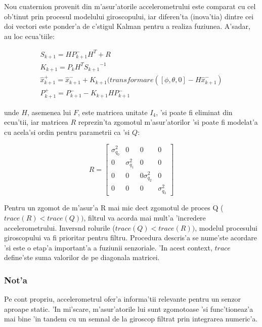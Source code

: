 \documentclass[12pt,a4paper,twoside]{report}
\begin{document}
\vspace{5px}

Nou cuaternion provenit din m'asur'atorile accelerometrului este comparat cu cel ob'tinut prin procesul modelului giroscopului, iar diferen'ta (inova'tia) dintre cei doi vectori este ponder'a de c\ia 'stigul Kalman pentru a realiza fuziunea. A'sadar, au loc ecua'tiile:

\begin{gather}
    S_{k+1} = H P^-_{k+1}H ^T + R \\
    K_{k+1} = P_k H^T {S_{k+1}}^{-1} \\
    \hat x^+_{k+1} = \hat x^-_{k+1} + K_{k+1} ( transformare([\phi, \theta, 0] - H  \hat x^-_{k+1}) \\
    P^+_{k+1} = P^-_{k+1} - K_{k+1} H P^-_{k+1}
\end{gather}

unde $H$, asemenea lui $F$, este matricea unitate $I_4$, 'si poate fi eliminat din ecua'tii, iar matricea $R$ reprezin'ta zgomotul m'asur'atorilor 'si poate fi modelat'a cu acela'si ordin pentru parametrii ca 'si $Q$: 

\begin{equation}
    R = \begin{bmatrix}
     \sigma_{q_0}^2 & 0 & 0 & 0 \\
    0 & \sigma_{q_1}^2 & 0 & 0  \\
    0 & 0 & 0  \sigma_{q_2}^2 & 0 \\
    0 & 0 & 0 &  \sigma_{q_3}^2
    \end{bmatrix}
\end{equation}

Pentru un zgomot de m'asur'a R mai mic dec\ia t zgomotul de proces Q ($trace(R)<trace(Q))$, filtrul va acorda mai mult'a 'incredere accelerometrului. Invers\ia nd rolurile ($trace(Q)<trace(R))$, modelul procesului giroscopului va fi prioritar pentru filtru. Procedura descris'a se nume'ste acordare 'si este o etap'a important'a a fuziunii senzoriale. 'In acest context, $trace$ define'ste suma valorilor de pe diagonala matricei.

\subsubsection{Not'a}

Pe cont propriu, accelerometrul ofer'a informa'tii relevante pentru un senzor aproape static. 'In mi'scare, m'asur'atorile lui sunt zgomotoase 'si func'tioneaz'a mai bine 'in tandem cu un semnal de la giroscop filtrat prin integrarea numeric'a.
\end{document}
